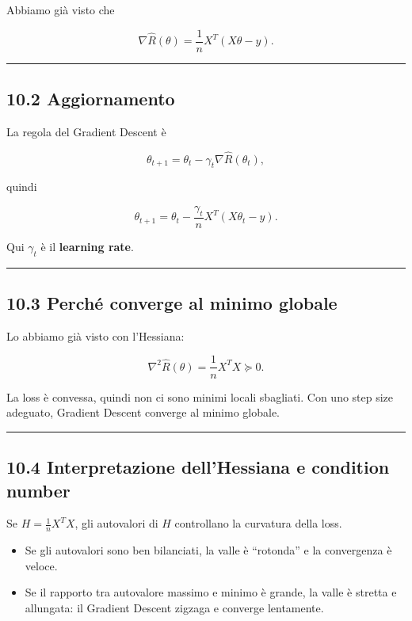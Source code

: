 \documentclass[
]{article}
\providecommand{\tightlist}{%
  \setlength{\itemsep}{0pt}\setlength{\parskip}{0pt}}
\begin{document}
Abbiamo già visto che

\[
\nabla \hat R(\theta)=\frac{1}{n}X^T(X\theta-y).
\]

\begin{center}\rule{0.5\linewidth}{0.5pt}\end{center}

\subsection{10.2 Aggiornamento}\label{aggiornamento}

La regola del Gradient Descent è

\[
\theta_{t+1}=\theta_t-\gamma_t \nabla \hat R(\theta_t),
\]

quindi

\[
\theta_{t+1}
=
\theta_t - \frac{\gamma_t}{n}X^T(X\theta_t-y).
\]

Qui \(\gamma_t\) è il \textbf{learning rate}.

\begin{center}\rule{0.5\linewidth}{0.5pt}\end{center}

\subsection{10.3 Perché converge al minimo
globale}\label{perchuxe9-converge-al-minimo-globale}

Lo abbiamo già visto con l'Hessiana:

\[
\nabla^2 \hat R(\theta)=\frac{1}{n}X^TX \succeq 0.
\]

La loss è convessa, quindi non ci sono minimi locali sbagliati. Con uno
step size adeguato, Gradient Descent converge al minimo globale.

\begin{center}\rule{0.5\linewidth}{0.5pt}\end{center}

\subsection{10.4 Interpretazione dell'Hessiana e condition
number}\label{interpretazione-dellhessiana-e-condition-number}

Se \(H=\frac{1}{n}X^TX\), gli autovalori di \(H\) controllano la
curvatura della loss.

\begin{itemize}
\tightlist
\item
  Se gli autovalori sono ben bilanciati, la valle è ``rotonda'' e la
  convergenza è veloce.
\item
  Se il rapporto tra autovalore massimo e minimo è grande, la valle è
  stretta e allungata: il Gradient Descent zigzaga e converge
  lentamente.
\end{itemize}
\end{document}
